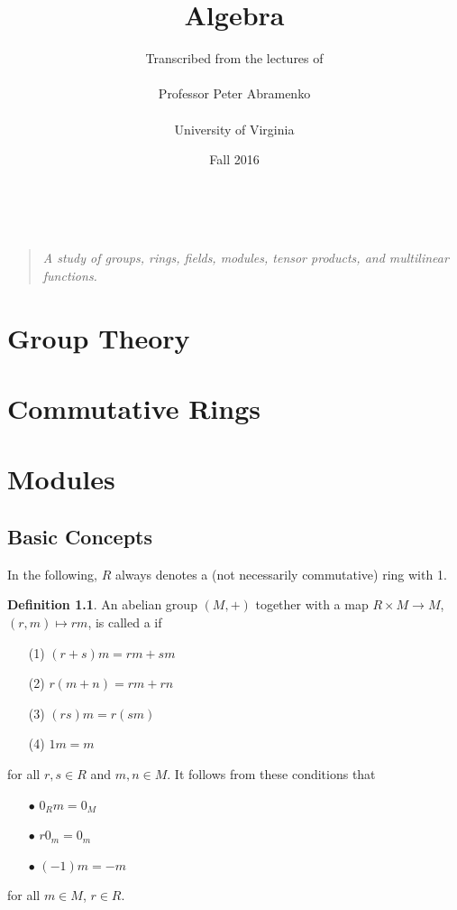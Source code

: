 \documentclass[11pt]{book}
\title{Algebra}
\author{ Transcribed from the lectures of \\ \ \\ Professor Peter Abramenko \\ \ \\ University of Virginia}
\date{Fall 2016}
\theoremstyle{definition}   \newtheorem{defn}[counter]{Definition} %
\DeclareMathOperator{\ra}{\rightarrow}   \DeclareMathOperator{\Poly}{\mathbf{P}}   \DeclareMathOperator{\spn}{\textnormal{span}}   \DeclareMathOperator{\aut}{\textnormal{Aut}}
\newcommand{\vs}{\vspace{8pt}}   \newcommand{\hs}{\hspace{8pt}}
\numberwithin{counter}{chapter}
\begin{document}
\frontmatter
\maketitle
\tableofcontents
\mainmatter

\ \vspace{100pt}
\begin{quote}
\centering
\textit{A study of groups, rings, fields, modules, tensor products, and multilinear functions.}
\end{quote}

\part{Group Theory}


\part{Commutative Rings}


\part{Modules}

\chapter{Basic Concepts}

In the following, $R$ always denotes a (not necessarily commutative) ring with 1.

\vs

\begin{defn}
An abelian group $(M,+)$ together with a map $R \times M \ra M$, $(r,m) \mapsto rm$, is called a  if
\begin{enumerate}
\item[(1)] $(r+s)m = rm + sm$
\item[(2)] $r(m+n) = rm + rn$
\item[(3)] $(rs)m = r(sm)$
\item[(4)] $1 m = m$
\end{enumerate}
for all $r,s \in R$ and $m,n \in M$. It follows from these conditions that
\begin{enumerate}
\item[$\bullet$] $0_R m = 0_M$
\item[$\bullet$] $r0_m = 0_m$
\item[$\bullet$] $(-1)m = -m$
\end{enumerate}
for all $m \in M$, $r \in R$.
\end{defn}
\end{document}

